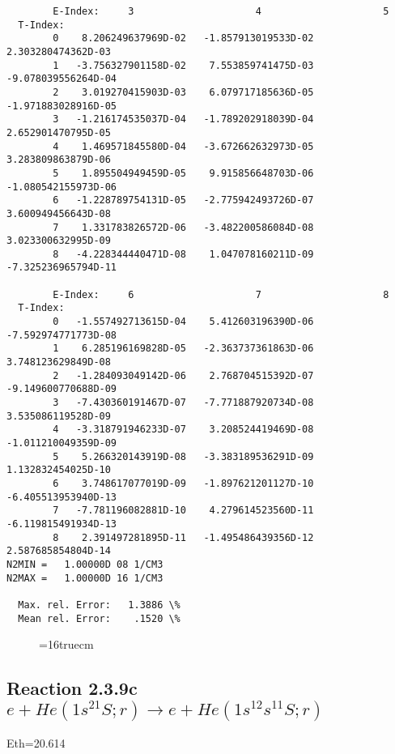 \documentclass[12pt,dvipdfmx]{article}
\begin{document}
{\begin{small}
\begin{verbatim}
        E-Index:     3                     4                     5
  T-Index:
        0    8.206249637969D-02   -1.857913019533D-02    2.303280474362D-03
        1   -3.756327901158D-02    7.553859741475D-03   -9.078039556264D-04
        2    3.019270415903D-03    6.079717185636D-05   -1.971883028916D-05
        3   -1.216174535037D-04   -1.789202918039D-04    2.652901470795D-05
        4    1.469571845580D-04   -3.672662632973D-05    3.283809863879D-06
        5    1.895504949459D-05    9.915856648703D-06   -1.080542155973D-06
        6   -1.228789754131D-05   -2.775942493726D-07    3.600949456643D-08
        7    1.331783826572D-06   -3.482200586084D-08    3.023300632995D-09
        8   -4.228344440471D-08    1.047078160211D-09   -7.325236965794D-11

        E-Index:     6                     7                     8
  T-Index:
        0   -1.557492713615D-04    5.412603196390D-06   -7.592974771773D-08
        1    6.285196169828D-05   -2.363737361863D-06    3.748123629849D-08
        2   -1.284093049142D-06    2.768704515392D-07   -9.149600770688D-09
        3   -7.430360191467D-07   -7.771887920734D-08    3.535086119528D-09
        4   -3.318791946233D-07    3.208524419469D-08   -1.011210049359D-09
        5    5.266320143919D-08   -3.383189536291D-09    1.132832454025D-10
        6    3.748617077019D-09   -1.897621201127D-10   -6.405513953940D-13
        7   -7.781196082881D-10    4.279614523560D-11   -6.119815491934D-13
        8    2.391497281895D-11   -1.495486439356D-12    2.587685854804D-14
N2MIN =   1.00000D 08 1/CM3
N2MAX =   1.00000D 16 1/CM3

  Max. rel. Error:   1.3886 \%
  Mean rel. Error:    .1520 \%

\end{verbatim}\end{small}
\begin{figure} \label{2.3.9b}
\epsfxsize=16truecm
\end{figure}
\newpage


\subsection{
Reaction 2.3.9c  $e + He(1s^21S;r) \rightarrow e + He(1s^12s^11S;r) $
}
Eth=20.614


\begin{small}\begin{verbatim}


\end{verbatim}
\end{small}}
\end{document}
